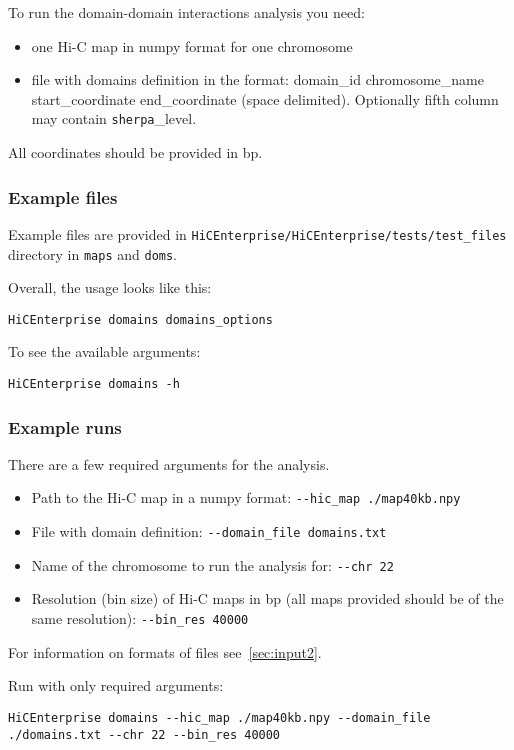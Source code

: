 To run the domain-domain interactions analysis you need:
\begin{itemize}
    \item one Hi-C map in numpy format for one chromosome
    \item file with domains definition in the format: domain\_id chromosome\_name start\_coordinate end\_coordinate (space
    delimited). Optionally fifth column may contain \lstinline{sherpa}\_level.
\end{itemize}

All coordinates should be provided in bp.

\subsubsection{Example files}
Example files are provided in \lstinline{HiCEnterprise/HiCEnterprise/tests/test_files} directory in \lstinline{maps} and \lstinline{doms}.

Overall, the usage looks like this:

\begin{lstlisting}
HiCEnterprise domains domains_options
\end{lstlisting}


To see the available arguments:
\begin{lstlisting}
HiCEnterprise domains -h
\end{lstlisting}


\subsubsection{Example runs}
There are a few required arguments for the analysis.
\begin{itemize}
    \item Path to the Hi-C map in a numpy format: \lstinline{--hic_map ./map40kb.npy}
    \item File with domain definition: \lstinline{--domain_file domains.txt}
    \item Name of the chromosome to run the analysis for: \lstinline{--chr 22}
    \item Resolution (bin size) of Hi-C maps in bp (all maps provided should be of the same resolution): \lstinline{--bin_res 40000}
\end{itemize}

For information on formats of files see~\ref{sec:input2}.

Run with only required arguments:
\begin{lstlisting}
HiCEnterprise domains --hic_map ./map40kb.npy --domain_file
./domains.txt --chr 22 --bin_res 40000
\end{lstlisting}


